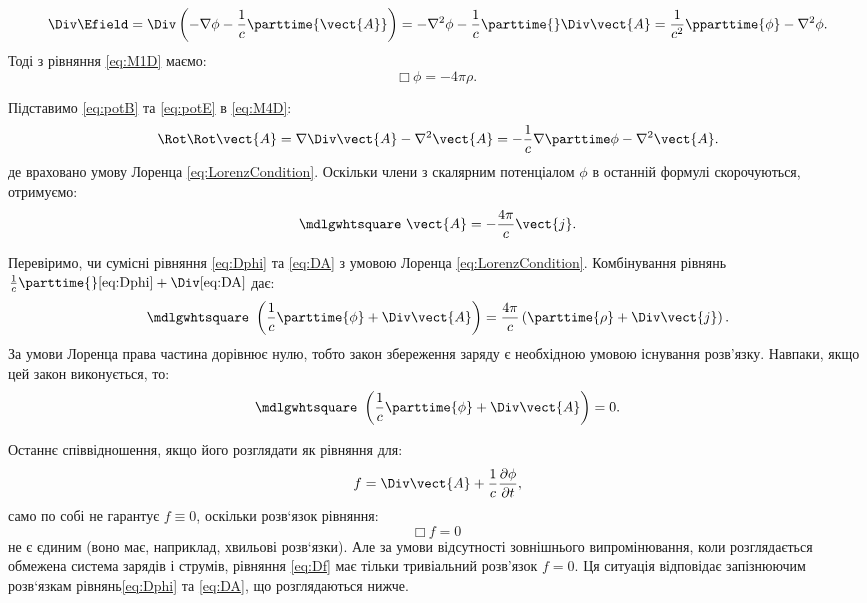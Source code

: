 \begin{equation*}
    \Div\Efield = \Div\left( -\nabla\phi - \frac1c \parttime{\vect{A}}\right) = - \nabla^2\phi - \frac1c \parttime{}\Div\vect{A} =
    \frac1{c^2}\pparttime{\phi} - \nabla^2\phi.
\end{equation*}
Тоді з рівняння \eqref{eq:M1D} маємо:
\begin{equation}\label{eq:Dphi}
	\mdlgwhtsquare\  \phi = -4\pi \rho.
\end{equation}

Підставимо \eqref{eq:potB} та \eqref{eq:potE} в \eqref{eq:M4D}:
\begin{equation*}
    \Rot\Rot\vect{A} = \nabla \Div\vect{A} - \nabla^2\vect{A} = -\frac1c \nabla \parttime\phi - \nabla^2\vect{A}.
\end{equation*}
де враховано умову Лоренца \eqref{eq:LorenzCondition}. Оскільки члени з скалярним потенціалом
$\phi$ в останній формулі скорочуються, отримуємо:
\begin{equation}\label{eq:DA}
	\mdlgwhtsquare\  \vect{A} = -\frac{4\pi}{c} \vect{j}.
\end{equation}

Перевіримо, чи сумісні рівняння \eqref{eq:Dphi} та \eqref{eq:DA} з умовою Лоренца \eqref{eq:LorenzCondition}.
Комбінування рівнянь $\frac1c \parttime{} \eqref{eq:Dphi} + \Div\eqref{eq:DA}$ дає:
\begin{equation}
	\mdlgwhtsquare\ \left( \frac1c \parttime{\phi} + \Div\vect{A} \right) = \frac{4\pi}c \left( \parttime{\rho} + \Div\vect{j}\right)  .
\end{equation}
За умови Лоренца права частина дорівнює нулю, тобто закон збереження
заряду є необхідною умовою існування розв’язку. Навпаки, якщо цей закон
виконується, то:
\begin{equation*}
	\mdlgwhtsquare\ \left( \frac1c \parttime{\phi} + \Div\vect{A} \right) = 0.
\end{equation*}

Останнє співвідношення, якщо його розглядати як рівняння для:
\begin{equation}
	f = \Div \vect{A} + \frac{1}{c} \frac{\partial \phi}{\partial t},
\end{equation}
само по собі не гарантує $f \equiv 0$, оскільки розв`язок
рівняння:
\begin{equation}\label{eq:Df}
	\mdlgwhtsquare\ f = 0
\end{equation}
не є єдиним (воно має, наприклад, хвильові розв`язки). Але за умови
відсутності зовнішнього випромінювання, коли розглядається обмежена
система зарядів і струмів, рівняння \eqref{eq:Df} має тільки тривіальний розв'язок
$f=0$. Ця ситуація відповідає запізнюючим розв`язкам рівнянь\eqref{eq:Dphi} та \eqref{eq:DA}, що
розглядаються нижче.


